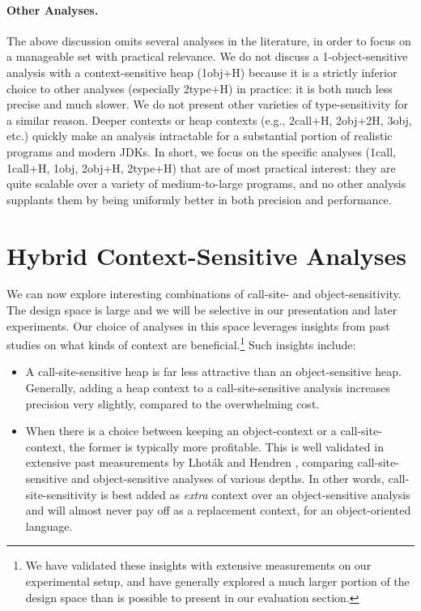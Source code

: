 \paragraph{Other Analyses.} The above discussion omits several analyses
in the literature, in order to focus on a manageable set with
practical relevance. We do not discuss a 1-object-sensitive analysis
with a context-sensitive heap (1obj+H) because it is a strictly
inferior choice to other analyses (especially 2type+H) in practice: it
is both much less precise and much slower. We do not present other
varieties of type-sensitivity for a similar reason. Deeper contexts or
heap contexts (e.g., 2call+H, 2obj+2H, 3obj, etc.) quickly make an
analysis intractable for a substantial portion of realistic programs
and modern JDKs. In short, we focus on the specific analyses (1call,
1call+H, 1obj, 2obj+H, 2type+H) that are of most practical interest:
they are quite scalable over a variety of medium-to-large programs,
and no other analysis supplants them by being uniformly better in both
precision and performance.



\section{Hybrid Context-Sensitive Analyses}
\label{sec:hybrid}

We can now explore interesting combinations of call-site- and
object-sensitivity. The design space is large and we will be selective
in our presentation and later experiments. Our choice of analyses in
this space leverages insights from past studies on what kinds of
context are beneficial.\footnote{We have validated these insights with
extensive measurements on our experimental setup, and have generally
explored a much larger portion of the design space than is possible to
present in our evaluation section.} Such insights include:
\begin{itemize}
\item A call-site-sensitive heap is far less attractive than an
object-sensitive heap. Generally, adding a heap context to a
call-site-sensitive analysis increases precision very slightly,
compared to the overwhelming cost.

\item When there is a choice between keeping an object-context or a
call-site-context, the former is typically more profitable. This is
well validated in extensive past measurements by Lhot\'{a}k and
Hendren \cite{article:2008:tosem:Lhotak}, comparing call-site-sensitive and
object-sensitive analyses of various depths. In other words,
call-site-sensitivity is best added as \emph{extra} context over an
object-sensitive analysis and will almost never pay off as a
replacement context, for an object-oriented language.
\end{itemize}

